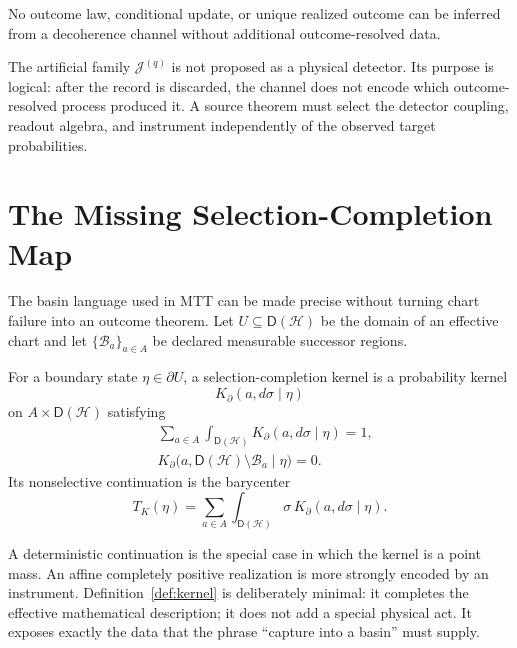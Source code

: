 \documentclass[11pt]{article}
\newcommand{\Hilb}{\mathcal H}
\newcommand{\Dens}{\mathsf D}
\newcommand{\Bas}{\mathcal B}
\begin{document}
\begin{corollary}\label{cor:nonselection}
No outcome law, conditional update, or unique realized outcome can be inferred
from a decoherence channel without additional outcome-resolved data.
\end{corollary}

The artificial family $\mathcal J^{(q)}$ is not proposed as a physical
detector.  Its purpose is logical: after the record is discarded, the channel
does not encode which outcome-resolved process produced it.  A source theorem
must select the detector coupling, readout algebra, and instrument
independently of the observed target probabilities.

\section{The Missing Selection-Completion Map}

The basin language used in MTT can be made precise without turning chart
failure into an outcome theorem.  Let $U\subseteq\Dens(\Hilb)$ be the domain
of an effective chart and let $\{\Bas_a\}_{a\in A}$ be declared measurable
successor regions.

\begin{definition}\label{def:kernel}
For a boundary state $\eta\in\partial U$, a selection-completion kernel is a
probability kernel
\[
 K_\partial(a,d\sigma\mid\eta)
\]
on $A\times\Dens(\Hilb)$ satisfying
\begin{align}
 &\sum_{a\in A}\int_{\Dens(\Hilb)}
 K_\partial(a,d\sigma\mid\eta)=1,
 \label{eq:kernel-normalization}\\
 &K_\partial\bigl(a,\Dens(\Hilb)\setminus\Bas_a\mid\eta\bigr)=0.
 \label{eq:kernel-support}
\end{align}
Its nonselective continuation is the barycenter
\begin{equation}
 T_K(\eta)=
 \sum_{a\in A}\int_{\Dens(\Hilb)}
 \sigma\,K_\partial(a,d\sigma\mid\eta).
 \label{eq:barycenter}
\end{equation}
\end{definition}

A deterministic continuation is the special case in which the kernel is a
point mass.  An affine completely positive realization is more strongly
encoded by an instrument.  Definition~\ref{def:kernel} is deliberately
minimal: it completes the effective mathematical description; it does not add
a special physical act.  It exposes exactly the data that the phrase
``capture into a basin'' must supply.
\end{document}

